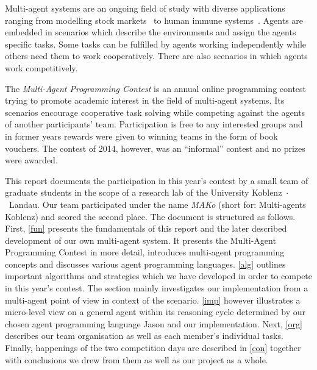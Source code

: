 Multi-agent systems are an ongoing field of study with diverse applications ranging from modelling stock markets~\cite{lebaron_building_2002} to human immune systems~\cite{folcik_basic_2007}.
Agents are embedded in scenarios which describe the environments and assign the agents specific tasks.
Some tasks can be fulfilled by agents working independently while others need them to work cooperatively.
There are also scenarios in which agents work competitively.

The \emph{Multi-Agent Programming Contest} is an annual online programming contest trying to promote academic interest in the field of multi-agent systems.
Its scenarios encourage cooperative task solving while competing against the agents of another participants' team.
Participation is free to any interested groups and in former years rewards were given to winning teams in the form of book vouchers.
The contest of 2014, however, was an \enquote{informal} contest and no prizes were awarded.

This report documents the participation in this year's contest by a small team of graduate students in the scope of a research lab of the University Koblenz~$\cdot$~Landau.
Our team participated under the name \emph{MAKo} (short for: Multi-agents Koblenz) and scored the second place.
The document is structured as follows.
First, \autoref{fun} presents the fundamentals of this report and the later described development of our own multi-agent system.
It presents the Multi-Agent Programming Contest in more detail, introduces multi-agent programming concepts and discusses various agent programming languages.
\autoref{alg} outlines important algorithms and strategies which we have developed in order to compete in this year's contest.
The section mainly investigates our implementation from a multi-agent point of view in context of the scenario.
\autoref{imp} however illustrates a micro-level view on a general agent within its reasoning cycle determined by our chosen agent programming language Jason and our implementation.
Next, \autoref{org} describes our team organisation as well as each member's individual tasks.
Finally, happenings of the two competition days are described in \autoref{con} together with conclusions we drew from them as well as our project as a whole.
